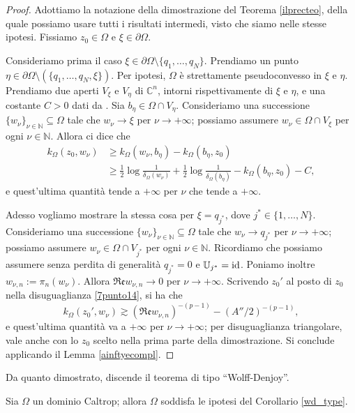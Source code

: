 \begin{proof}
    Adottiamo la notazione della dimostrazione del Teorema \ref{ilprecteo}, della quale possiamo usare tutti i risultati intermedi, visto che siamo nelle stesse ipotesi. Fissiamo $z_0\in\Omega$ e $\xi\in\partial\Omega$.
    
    Consideriamo prima il caso $\xi\in\partial\Omega\setminus\{q_1,\dots,q_N\}$. Prendiamo un punto $\eta\in\partial\Omega\setminus(\{q_1,\dots,q_N,\xi\})$. Per ipotesi, $\Omega$ è strettamente pseudoconvesso in $\xi$ e $\eta$. Prendiamo due aperti $V_\xi$ e $V_\eta$ di $\mathbb{C}^n$, intorni rispettivamente di $\xi$ e $\eta$, e una costante $C>0$ dati da \cite[Corollary 2.4]{FR}. Sia $b_\eta\in\Omega\cap V_\eta$. Consideriamo una successione $\{w_\nu\}_{\nu\in\mathbb{N}}\subseteq\Omega$ tale che $w_\nu\longrightarrow\xi$ per $\nu\longrightarrow+\infty$; possiamo assumere $w_\nu\in\Omega\cap V_\xi$ per ogni $\nu\in\mathbb{N}$. Allora \cite[Corollary 2.4]{FR} ci dice che
    \begin{align*}
        k_\Omega(z_0,w_\nu)&\ge k_\Omega(w_\nu,b_\eta)-k_\Omega(b_\eta,z_0)\\
        &\ge \frac{1}{2}\log{\frac{1}{\delta_\Omega(w_\nu)}}+\frac{1}{2}\log{\frac{1}{\delta_\Omega(b_\eta)}}-k_\Omega(b_\eta,z_0)-C,
    \end{align*}
    e quest'ultima quantità tende a $+\infty$ per $\nu$ che tende a $+\infty$.

    Adesso vogliamo mostrare la stessa cosa per $\xi=q_{j^*}$, dove $j^*\in\{1,\dots,N\}$. Consideriamo una successione $\{w_\nu\}_{\nu\in\mathbb{N}}\subseteq\Omega$ tale che $w_\nu\longrightarrow q_{j^*}$ per $\nu\longrightarrow+\infty$; possiamo assumere $w_\nu\in\Omega\cap V_{j^*}$ per ogni $\nu\in\mathbb{N}$. Ricordiamo che possiamo assumere senza perdita di generalità $q_{j^*}=0$ e $\mathbb{U}_{j^*}=\operatorname{id}$. Poniamo inoltre $w_{\nu,n}:=\pi_n(w_\nu)$. Allora $\mathfrak{Re}w_{\nu,n}\longrightarrow0$ per $\nu\longrightarrow+\infty$. Scrivendo $z_0'$ al posto di $z_0$ nella disuguaglianza \eqref{7punto14}, si ha che
    $$k_\Omega(z_0',w_\nu)\gtrsim (\mathfrak{Re}w_{\nu,n})^{-(p-1)}-(A''/2)^{-(p-1)},$$
    e quest'ultima quantità va a $+\infty$ per $\nu\longrightarrow+\infty$; per disuguaglianza triangolare, vale anche con lo $z_0$ scelto nella prima parte della dimostrazione. Si conclude applicando il Lemma \ref{ainftyecompl}.
\end{proof}

Da quanto dimostrato, discende il teorema di tipo ``Wolff-Denjoy''.

\begin{cor}
    Sia $\Omega$ un dominio Caltrop; allora $\Omega$ soddisfa le ipotesi del Corollario \ref{wd_type}.
\end{cor}